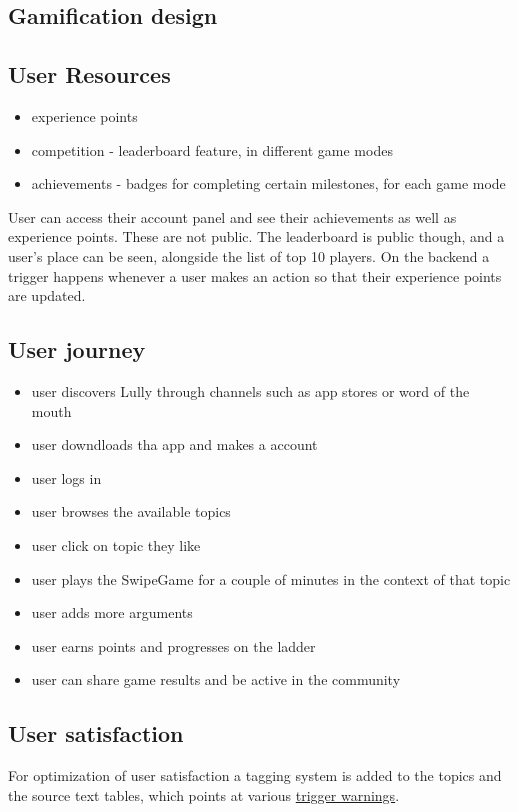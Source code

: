 \documentclass{article}
\begin{document}
\subsection{Gamification design}
\subsection{User Resources}
\begin{itemize}
  \item experience points 
  \item competition - leaderboard feature, in different game modes
  \item achievements - badges for completing certain milestones, for each game mode
\end{itemize}

User can access their account panel and see their achievements as well as experience points. These are not public. The leaderboard is public though, and a user's place can be seen, alongside the list of top 10 players. On the backend a trigger happens whenever a user makes an action so that their experience points are updated.

\subsection{User journey}
\begin{itemize}
  \item user discovers Lully through channels such as app stores or word of the mouth
  \item user downdloads tha app and makes a account
  \item user logs in
  \item user browses the available topics
  \item user click on topic they like
  \item user plays the SwipeGame for a couple of minutes in the context of that topic
  \item user adds more arguments
  \item user earns points and progresses on the ladder
  \item user can share game results and be active in the community
\end{itemize}

\subsection{User satisfaction}
For optimization of user satisfaction a tagging system is added to the topics and the source text tables, which points at various \href{https://adancewithbooks.wordpress.com/2019/09/22/a-small-list-of-trigger-warnings-you-can-use/}{trigger warnings}.
\newpage
\end{document}
